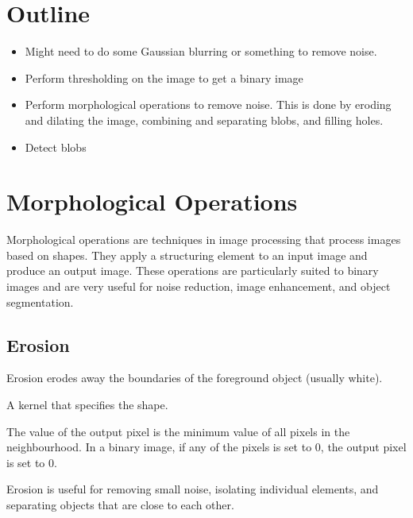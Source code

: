 \section{Outline}
\begin{itemize}
      \item Might need to do some Gaussian blurring or something to remove noise.
      \item Perform thresholding on the image to get a binary image
      \item Perform morphological operations to remove noise. This is done by eroding and dilating the image, combining and separating blobs, and filling holes.
      \item Detect blobs
\end{itemize}

\section{Morphological Operations}

Morphological operations are techniques in image processing that process images based on shapes. They apply a structuring element to an input image and produce an output image. These operations are particularly suited to binary images and are very useful for noise reduction, image enhancement, and object segmentation.



\subsection{Erosion}
\begin{description}[style=nextline]
      \item[How it Works:]
            Erosion erodes away the boundaries of the foreground object (usually white).
      \item[Structuring Element:]
            A kernel that specifies the shape.
      \item[Operation:]
            The value of the output pixel is the minimum value of all pixels in the neighbourhood. In a binary image, if any of the pixels is set to 0, the output pixel is set to 0.
      \item[Use:]
            Erosion is useful for removing small noise, isolating individual elements, and separating objects that are close to each other.
\end{description}

